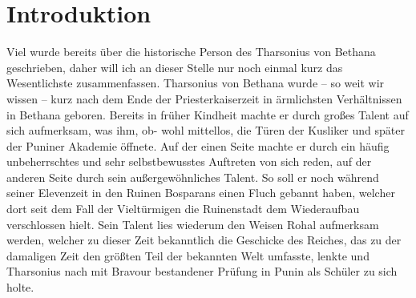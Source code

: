 \documentclass[11pt]{article}
\begin{document}
\section{Introduktion}
Viel wurde bereits über die historische Person des Tharsonius von Bethana geschrieben, daher will ich an
dieser Stelle nur noch einmal kurz das Wesentlichste zusammenfassen. Tharsonius von Bethana wurde –
so weit wir wissen – kurz nach dem Ende der Priesterkaiserzeit in ärmlichsten Verhältnissen in Bethana
geboren. Bereits in früher Kindheit machte er durch großes Talent auf sich aufmerksam, was ihm, ob-
wohl mittellos, die Türen der Kusliker und später der Puniner Akademie öffnete. Auf der einen Seite
machte er durch ein häufig unbeherrschtes und sehr selbstbewusstes Auftreten von sich reden, auf der
anderen Seite durch sein außergewöhnliches Talent. So soll er noch während seiner Elevenzeit in den
Ruinen Bosparans einen Fluch gebannt haben, welcher dort seit dem Fall der Vieltürmigen die Ruinenstadt dem Wiederaufbau verschlossen hielt. Sein Talent lies wiederum den Weisen Rohal aufmerksam
werden, welcher zu dieser Zeit bekanntlich die Geschicke des Reiches, das zu der damaligen Zeit den
größten Teil der bekannten Welt umfasste, lenkte und Tharsonius nach mit Bravour bestandener Prüfung
in Punin als Schüler zu sich holte.
\end{document}
